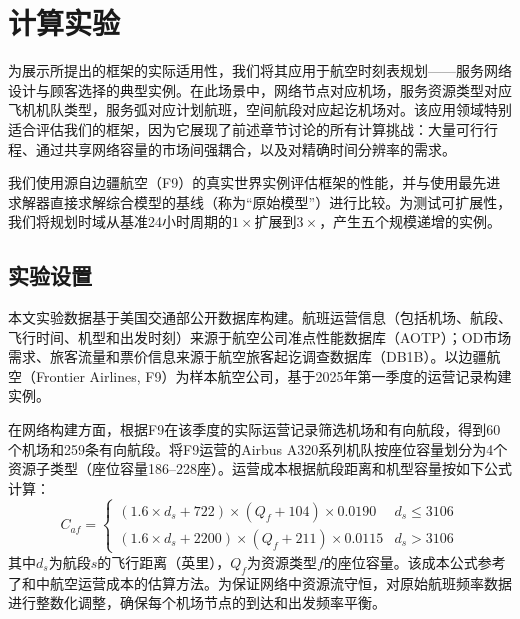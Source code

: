 \chapter{计算实验}
\label{sec:comp_study}

为展示所提出的\algoNotation 框架的实际适用性，我们将其应用于航空时刻表规划——服务网络设计与顾客选择的典型实例。在此场景中，网络节点对应机场，服务资源类型对应飞机机队类型，服务弧对应计划航班，空间航段对应起讫机场对。该应用领域特别适合评估我们的框架，因为它展现了前述章节讨论的所有计算挑战：大量可行行程、通过共享网络容量的市场间强耦合，以及对精确时间分辨率的需求。

我们使用源自边疆航空（F9）的真实世界实例评估\algoNotation 框架的性能，并与使用最先进求解器直接求解综合模型的基线（称为“原始模型”）进行比较。为测试可扩展性，我们将规划时域从基准24小时周期的$1\times$扩展到$3\times$，产生五个规模递增的实例。

\section{实验设置}


本文实验数据基于美国交通部公开数据库构建。航班运营信息（包括机场、航段、飞行时间、机型和出发时刻）来源于航空公司准点性能数据库（AOTP）\citep{DOT_OTP_2025}；OD市场需求、旅客流量和票价信息来源于航空旅客起讫调查数据库（DB1B）\citep{DOT_DB1B_2025}。以边疆航空（Frontier Airlines, F9）为样本航空公司，基于2025年第一季度的运营记录构建实例。

在网络构建方面，根据F9在该季度的实际运营记录筛选机场和有向航段，得到60个机场和259条有向航段。将F9运营的Airbus A320系列机队按座位容量划分为4个资源子类型（座位容量186--228座）。运营成本根据航段距离和机型容量按如下公式计算：
\[
    C_{af} = 
    \begin{cases} 
    (1.6 \times d_s + 722) \times (Q_f + 104) \times 0.0190 & d_s \le 3106 \\
    (1.6 \times d_s + 2200) \times (Q_f + 211) \times 0.0115 & d_s > 3106 
    \end{cases}
\]
其中$d_s$为航段$s$的飞行距离（英里），$Q_f$为资源类型$f$的座位容量。该成本公式参考了\citet{swan2006aircraft}和\citet{wei2020airline}中航空运营成本的估算方法。为保证网络中资源流守恒，对原始航班频率数据进行整数化调整，确保每个机场节点的到达和出发频率平衡。

